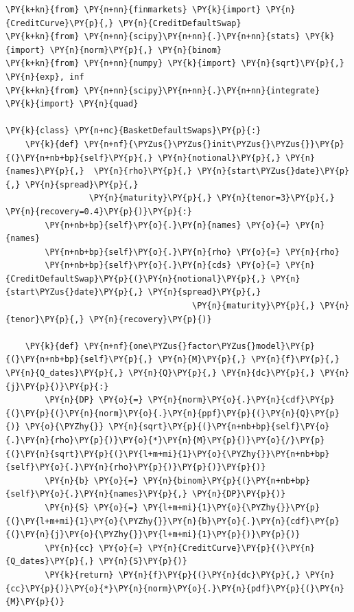 \begin{tcolorbox}[breakable, size=fbox, boxrule=1pt, pad at break*=1mm,colback=cellbackground, colframe=cellborder]
\begin{Verbatim}[commandchars=\\\{\}]
\PY{k+kn}{from} \PY{n+nn}{finmarkets} \PY{k}{import} \PY{n}{CreditCurve}\PY{p}{,} \PY{n}{CreditDefaultSwap}
\PY{k+kn}{from} \PY{n+nn}{scipy}\PY{n+nn}{.}\PY{n+nn}{stats} \PY{k}{import} \PY{n}{norm}\PY{p}{,} \PY{n}{binom}
\PY{k+kn}{from} \PY{n+nn}{numpy} \PY{k}{import} \PY{n}{sqrt}\PY{p}{,} \PY{n}{exp}, inf
\PY{k+kn}{from} \PY{n+nn}{scipy}\PY{n+nn}{.}\PY{n+nn}{integrate} \PY{k}{import} \PY{n}{quad}
		
\PY{k}{class} \PY{n+nc}{BasketDefaultSwaps}\PY{p}{:}
    \PY{k}{def} \PY{n+nf}{\PYZus{}\PYZus{}init\PYZus{}\PYZus{}}\PY{p}{(}\PY{n+nb+bp}{self}\PY{p}{,} \PY{n}{notional}\PY{p}{,} \PY{n}{names}\PY{p}{,}  \PY{n}{rho}\PY{p}{,} \PY{n}{start\PYZus{}date}\PY{p}{,} \PY{n}{spread}\PY{p}{,} 
                 \PY{n}{maturity}\PY{p}{,} \PY{n}{tenor=3}\PY{p}{,} \PY{n}{recovery=0.4}\PY{p}{)}\PY{p}{:}
        \PY{n+nb+bp}{self}\PY{o}{.}\PY{n}{names} \PY{o}{=} \PY{n}{names}
        \PY{n+nb+bp}{self}\PY{o}{.}\PY{n}{rho} \PY{o}{=} \PY{n}{rho}
        \PY{n+nb+bp}{self}\PY{o}{.}\PY{n}{cds} \PY{o}{=} \PY{n}{CreditDefaultSwap}\PY{p}{(}\PY{n}{notional}\PY{p}{,} \PY{n}{start\PYZus{}date}\PY{p}{,} \PY{n}{spread}\PY{p}{,} 
                                      \PY{n}{maturity}\PY{p}{,} \PY{n}{tenor}\PY{p}{,} \PY{n}{recovery}\PY{p}{)} 
		
    \PY{k}{def} \PY{n+nf}{one\PYZus{}factor\PYZus{}model}\PY{p}{(}\PY{n+nb+bp}{self}\PY{p}{,} \PY{n}{M}\PY{p}{,} \PY{n}{f}\PY{p}{,} \PY{n}{Q_dates}\PY{p}{,} \PY{n}{Q}\PY{p}{,} \PY{n}{dc}\PY{p}{,} \PY{n}{j}\PY{p}{)}\PY{p}{:}
        \PY{n}{DP} \PY{o}{=} \PY{n}{norm}\PY{o}{.}\PY{n}{cdf}\PY{p}{(}\PY{p}{(}\PY{n}{norm}\PY{o}{.}\PY{n}{ppf}\PY{p}{(}\PY{n}{Q}\PY{p}{)} \PY{o}{\PYZhy{}} \PY{n}{sqrt}\PY{p}{(}\PY{n+nb+bp}{self}\PY{o}{.}\PY{n}{rho}\PY{p}{)}\PY{o}{*}\PY{n}{M}\PY{p}{)}\PY{o}{/}\PY{p}{(}\PY{n}{sqrt}\PY{p}{(}\PY{l+m+mi}{1}\PY{o}{\PYZhy{}}\PY{n+nb+bp}{self}\PY{o}{.}\PY{n}{rho}\PY{p}{)}\PY{p}{)}\PY{p}{)}
        \PY{n}{b} \PY{o}{=} \PY{n}{binom}\PY{p}{(}\PY{n+nb+bp}{self}\PY{o}{.}\PY{n}{names}\PY{p}{,} \PY{n}{DP}\PY{p}{)}
        \PY{n}{S} \PY{o}{=} \PY{l+m+mi}{1}\PY{o}{\PYZhy{}}\PY{p}{(}\PY{l+m+mi}{1}\PY{o}{\PYZhy{}}\PY{n}{b}\PY{o}{.}\PY{n}{cdf}\PY{p}{(}\PY{n}{j}\PY{o}{\PYZhy{}}\PY{l+m+mi}{1}\PY{p}{)}\PY{p}{)}
        \PY{n}{cc} \PY{o}{=} \PY{n}{CreditCurve}\PY{p}{(}\PY{n}{Q_dates}\PY{p}{,} \PY{n}{S}\PY{p}{)}
        \PY{k}{return} \PY{n}{f}\PY{p}{(}\PY{n}{dc}\PY{p}{,} \PY{n}{cc}\PY{p}{)}\PY{o}{*}\PY{n}{norm}\PY{o}{.}\PY{n}{pdf}\PY{p}{(}\PY{n}{M}\PY{p}{)}
		

\end{Verbatim}
\end{tcolorbox}
